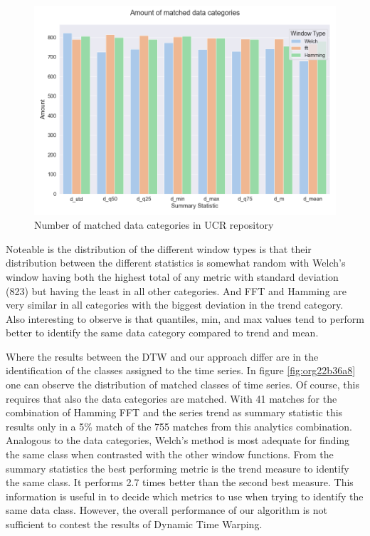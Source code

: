 \documentclass[phd,black, hidelinks]{PrincetonThesis}
\begin{document}
\begin{figure}[htbp]
\centering
\includegraphics[width=.9\linewidth]{./img/fft_matched_cats.png}
\caption{\label{fig:orgd44a1fc}Number of matched data categories in UCR repository}
\end{figure}

Noteable is the distribution of the different window types is that their distribution between the different statistics is somewhat random with Welch's window having both the highest total of any metric with standard deviation (823) but having the least in all other categories. And FFT and Hamming are very similar in all categories with the biggest deviation in the trend category. Also interesting to observe is that quantiles, min, and max values tend to perform better to identify the same data category compared to trend and mean.

Where the results between the DTW and our approach differ are in the identification of the classes assigned to the time series. In figure \ref{fig:org22b36a8} one can observe the distribution of matched classes of time series. Of course, this requires that also the data categories are matched. With 41 matches for the combination of Hamming FFT and the series trend as summary statistic this results only in a 5\% match of the 755 matches from this analytics combination. Analogous to the data categories, Welch's method is most adequate for finding the same class when contrasted with the other window functions. From the summary statistics the best performing metric is the trend measure to identify the same class. It performs 2.7 times better than the second best measure. This information is useful in to decide which metrics to use when trying to identify the same data class. However, the overall performance of our algorithm is not sufficient to contest the results of Dynamic Time Warping.
\end{document}

